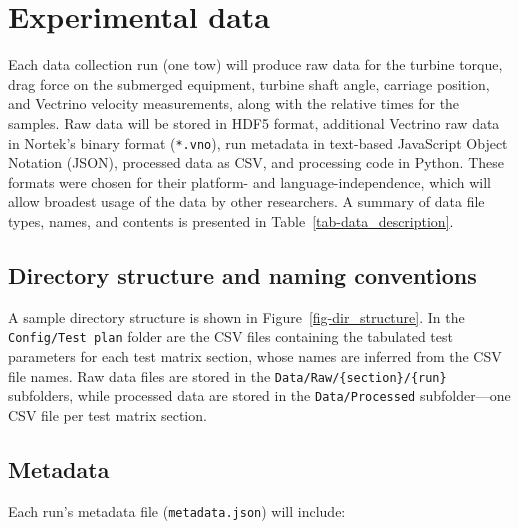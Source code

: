 \documentclass[12pt,letterpaper]{scrreprt}
\begin{document}
\section{Experimental data}\label{sec-exp_data}

Each data collection run (one tow) will produce raw data for the turbine torque,
drag force on the submerged equipment, turbine shaft angle, carriage position,
and Vectrino velocity measurements, along with the relative times for the
samples. Raw data will be stored in HDF5 format, additional Vectrino raw data in
Nortek's binary format (\texttt{*.vno}), run metadata in text-based JavaScript
Object Notation (JSON), processed data as CSV, and processing code in Python.
These formats were chosen for their platform- and language-independence, which
will allow broadest usage of the data by other researchers. A summary of data
file types, names, and contents is presented in
Table~\ref{tab-data_description}.

\subsection{Directory structure and naming conventions}

A sample directory structure is shown in Figure~\ref{fig-dir_structure}. In the
\texttt{Config/Test plan} folder are the CSV files containing the tabulated test
parameters for each test matrix section, whose names are inferred from the CSV
file names. Raw data files are stored in the
\texttt{Data/Raw/\{section\}/\{run\}} subfolders, while processed data are
stored in the \texttt{Data/Processed} subfolder---one CSV file per test matrix
section.

\subsection{Metadata}

Each run's metadata file (\texttt{metadata.json}) will include:
\end{document}

